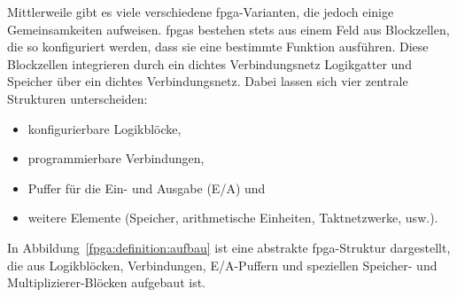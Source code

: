 Mittlerweile gibt es viele verschiedene \gls{fpga}-Varianten, die jedoch einige
Gemeinsamkeiten aufweisen. \gls{fpga}s bestehen stets aus einem Feld aus
Blockzellen, die so konfiguriert werden, dass sie eine bestimmte Funktion
ausführen. Diese Blockzellen integrieren durch ein dichtes Verbindungsnetz
Logikgatter und Speicher über ein dichtes Verbindungsnetz. Dabei lassen sich
vier zentrale Strukturen unterscheiden:
\begin{itemize}
    \item konfigurierbare Logikblöcke,
    \item programmierbare Verbindungen,
    \item Puffer für die Ein- und Ausgabe (E/A) und
    \item weitere Elemente (Speicher, arithmetische Einheiten, Taktnetzwerke,
          usw.).
\end{itemize}
In Abbildung~\ref{fpga:definition:aufbau} ist eine abstrakte \gls{fpga}-Struktur
dargestellt, die aus Logikblöcken, Verbindungen, E/A-Puffern und speziellen
Speicher- und Multiplizierer-Blöcken aufgebaut ist.
\cite[vgl.][10-13--10-14]{hawkins2010}

